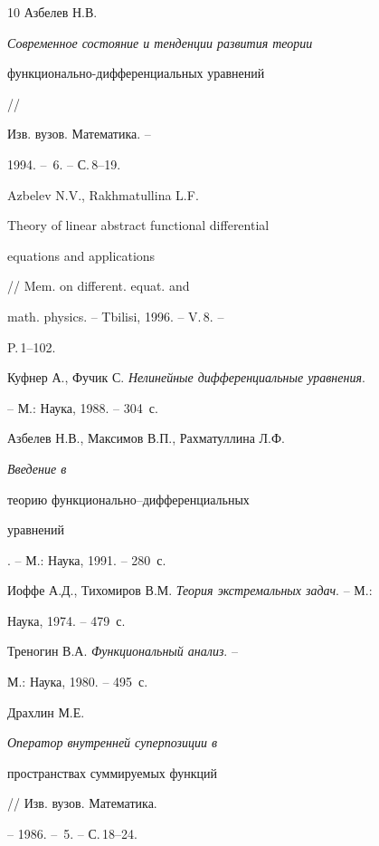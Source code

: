 \begin{thebibliography}{10}
Азбелев Н.В. {\em Современное состояние и тенденции развития теории


функционально-дифференциальных уравнений} //


Изв. вузов. Математика. --


1994. -- \No\,6. -- С.\,8--19.







Azbelev N.V., Rakhmatullina L.F. {\em


Theory of linear abstract functional differential


equations and applications} // Mem. on different. equat. and


math. physics. -- Tbilisi, 1996. -- V.\,8. --


P.\,1--102.







Куфнер А., Фучик С. {\em Нелинейные дифференциальные уравнения}.


-- М.: Наука, 1988. -- 304~с.







Азбелев Н.В., Максимов В.П., Рахматуллина Л.Ф. {\em Введение в


теорию функционально--дифференциальных


уравнений}. -- М.: Наука, 1991. -- 280~с.







Иоффе А.Д., Тихомиров В.М. {\em Теория экстремальных задач}. -- М.:


Наука, 1974. -- 479~с.





 Треногин В.А. {\em Функциональный анализ}. --


М.: Наука, 1980. -- 495~с.





 Драхлин М.Е. {\em Оператор внутренней суперпозиции в


пространствах суммируемых функций} // Изв. вузов. Математика.


-- 1986. -- \No\,5. -- С.\,18--24.








\end{thebibliography}





\vskip 2cm















